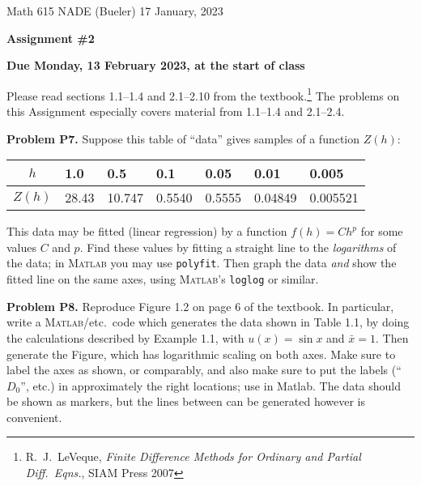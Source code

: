 \documentclass[12pt]{amsart}
\newcommand{\Matlab}{\textsc{Matlab}\xspace}
\newcommand{\prob}[1]{\bigskip\noindent\textbf{#1}\quad }
\begin{document}
\scriptsize \noindent Math 615 NADE (Bueler) \hfill 17 January, 2023
\normalsize

\medskip\bigskip

\Large\centerline{\textbf{Assignment \#2}}
\large
\bigskip

\centerline{\textbf{Due Monday, 13 February 2023, at the start of class}}
\bigskip
\normalsize

\thispagestyle{empty}

\bigskip
Please read sections 1.1--1.4 and 2.1--2.10 from the textbook.\footnote{R.~J.~LeVeque, \emph{Finite Difference Methods for Ordinary and Partial Diff.~Eqns.}, SIAM Press 2007}  The problems on this Assignment especially covers material from 1.1--1.4 and 2.1--2.4.

\medskip
\prob{Problem P7.}  Suppose this table of ``data'' gives samples of a function $Z(h)$:

\smallskip
\begin{center}
\begin{tabular}{c|l|l|l|l|l|l}
$h$ & 1.0     & 0.5    & 0.1    & 0.05   & 0.01     & 0.005 \\ \hline
$Z(h)$ & 28.43 & 10.747 & 0.5540 & 0.5555 & 0.04849 & 0.005521
\end{tabular}
\end{center}
\medskip

\noindent This data may be fitted (linear regression) by a function $f(h) = C h^p$ for some values $C$ and $p$.  Find these values by fitting a straight line to the \emph{logarithms} of the data; in \Matlab you may use \texttt{polyfit}.  Then graph the data \emph{and} show the fitted line on the same axes, using \Matlab's \texttt{loglog} or similar.

\begin{comment}
h = [1.0 0.5 0.1 0.05 0.01 0.005];
Z = [28.43  10.747  0.5540  0.5555  0.04849  0.005521];
q = polyfit(log(h),log(Z),1)
loglog(h,Z,'ko',h,exp(q(2) + q(1)*log(h)),'k--')
axis tight
print -dpdf Zofh.pdf
\end{comment}


\prob{Problem P8.}  Reproduce Figure 1.2 on page 6 of the textbook.  In particular, write a  \Matlab/etc.~code which generates the data shown in Table 1.1, by doing the calculations described by Example 1.1, with $u(x)=\sin x$ and $\bar x = 1$.  Then generate the Figure, which has logarithmic scaling on both axes.  Make sure to label the axes as shown, or comparably, and also make sure to put the labels (``$D_0$'', etc.) in approximately the right locations; use  in Matlab.  The data should be shown as markers, but the lines between can be generated however is convenient.
\end{document}

